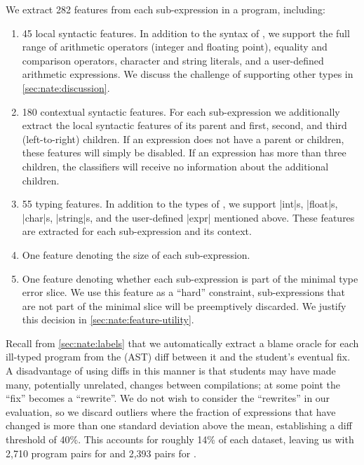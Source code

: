 We extract 282 features from each sub-expression in a
program, including:
%
\begin{enumerate}
\item 45 local syntactic features. In addition to the syntax of \lang,
  we support the full range of arithmetic operators (integer and
  floating point), equality and comparison operators, character and
  string literals, and a user-defined %
  arithmetic
  expressions. We discuss the challenge of supporting other
  types in \autoref{sec:nate:discussion}.
\item 180 contextual syntactic features. For each sub-expression we
  additionally extract the local syntactic features of its parent and
  first, second, and third (left-to-right) children. If an expression
  does not have a parent or children, these features will simply be
  disabled. If an expression has more than three children, the
  classifiers will receive no information about the additional
  children.
\item 55 typing features. In addition to the types of \lang, we support
  |int|s, |float|s, |char|s, |string|s, and the user-defined |expr|
  mentioned above. These features are extracted for each sub-expression
  and its context. %
\item One feature denoting the size of each sub-expression.
\item One feature denoting whether each sub-expression is part of the
  minimal type error slice. We use this feature as a ``hard''
  constraint, sub-expressions that are not part of the minimal slice
  will be preemptively discarded. We justify this decision in
  \autoref{sec:nate:feature-utility}.
\end{enumerate}

Recall from \autoref{sec:nate:labels} that we automatically extract a blame
oracle for each ill-typed program from the (AST) diff between it and the
student's eventual fix.
%
A disadvantage of using diffs in this manner is that students may have
made many, potentially unrelated, changes between compilations; at some
point the ``fix'' becomes a ``rewrite''.
%
We do not wish to consider the ``rewrites'' in our evaluation, so we
discard outliers where the fraction of expressions that have changed is
more than one standard deviation above the mean, establishing a diff
threshold of 40\%.
%
This accounts for roughly 14\% of each dataset, leaving us with
2,710 program pairs for \SPRING and 2,393 pairs for \FALL.

